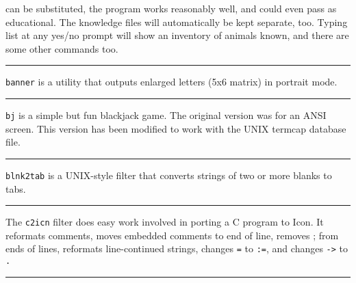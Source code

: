 {

\noindent can be substituted, the program works reasonably well, and could even
pass as educational. The knowledge files will automatically be kept
separate, too. Typing {\textquotedbl}list{\textquotedbl} at any yes/no
prompt will show an inventory of animals known, and there are some
other commands too. 

\vspace{0.25cm}\hrule{}

\texttt{banner} is a utility that outputs enlarged letters (5x6 matrix) in
portrait mode.

\vspace{0.25cm}\hrule{}

\texttt{bj} is a simple but fun blackjack game. The original version was
for an ANSI screen. This version has been modified to work with the
UNIX termcap database file.

\vspace{0.25cm}\hrule{}

\texttt{blnk2tab} is a UNIX-style filter that converts strings of two or
more blanks to tabs.

\vspace{0.25cm}\hrule{}

The \texttt{c2icn} filter does easy work involved in porting a C
program to Icon. It reformats comments, moves embedded
comments to end of line, removes {\textquotedbl};{\textquotedbl}
from ends of lines, reformats line-continued strings, changes
\texttt{=} to \texttt{:=}, and changes \texttt{{}-{\textgreater}} to
\texttt{.} 

\vspace{0.25cm}\hrule{}

}
